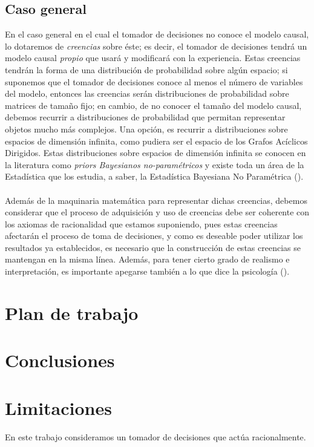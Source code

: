 \documentclass[11pt]{article}
\theoremstyle{plain}
\begin{document}
\subsection{Caso general}
En el caso general en el cual el tomador de decisiones no conoce el modelo causal, lo dotaremos de \textit{creencias} sobre éste; es decir, el tomador de decisiones tendrá un modelo causal \textit{propio} que usará y modificará con la experiencia. Estas creencias tendrán la forma de una distribución de probabilidad sobre algún espacio; si suponemos que el tomador de decisiones conoce al menos el número de variables del modelo, entonces las creencias serán distribuciones de probabilidad sobre matrices de tamaño fijo; en cambio, de no conocer el tamaño del modelo causal, debemos recurrir a distribuciones de probabilidad que permitan representar objetos mucho más complejos. Una opción, es recurrir a distribuciones sobre espacios de dimensión infinita, como pudiera ser el espacio de los Grafos Acíclicos Dirigidos. Estas distribuciones sobre espacios de dimensión infinita se conocen en la literatura como \textit{priors Bayesianos no-paramétricos} y existe toda un área de la Estadística que los estudia, a saber, la Estadística Bayesiana No Paramétrica (\cite{ghosal2017fundamentals}).\\
\\
Además de la maquinaria matemática para representar dichas creencias, debemos considerar que el proceso de adquisición y uso de creencias debe ser coherente con los axiomas de racionalidad que estamos suponiendo, pues estas creencias afectarán el proceso de toma de decisiones, y como es deseable poder utilizar los resultados ya establecidos, es necesario que la construcción de estas creencias se mantengan en la misma línea. Además, para tener cierto grado de realismo e interpretación, es importante apegarse también a lo que dice la psicología (\cite{larrouy2017mindreading}).

\section{Plan de trabajo}

\section{Conclusiones}

\section{Limitaciones}
En este trabajo consideramos un tomador de decisiones que actúa racionalmente.
\end{document}
